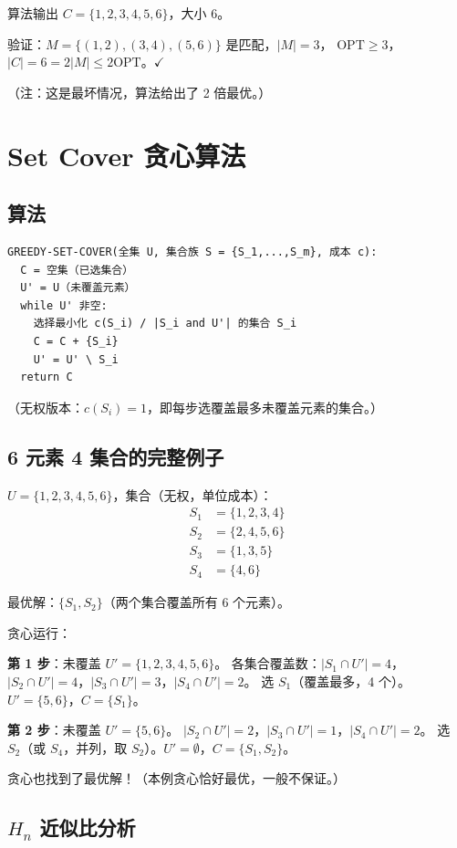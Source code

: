 \documentclass[UTF8,openany,12pt]{ctexbook}
\theoremstyle{remark}
\newcommand{\OPT}{\mathrm{OPT}}
\begin{document}
算法输出 $C = \{1,2,3,4,5,6\}$，大小 6。

验证：$M = \{(1,2),(3,4),(5,6)\}$ 是匹配，$|M|=3$，
$\OPT \ge 3$，$|C|=6=2|M| \le 2\OPT$。$\checkmark$

（注：这是最坏情况，算法给出了 2 倍最优。）

\section{Set Cover 贪心算法}

\subsection{算法}

\begin{lstlisting}[language={}]
GREEDY-SET-COVER(全集 U, 集合族 S = {S_1,...,S_m}, 成本 c):
  C = 空集（已选集合）
  U' = U（未覆盖元素）
  while U' 非空:
    选择最小化 c(S_i) / |S_i and U'| 的集合 S_i
    C = C + {S_i}
    U' = U' \ S_i
  return C
\end{lstlisting}

（无权版本：$c(S_i) = 1$，即每步选覆盖最多未覆盖元素的集合。）

\subsection{6 元素 4 集合的完整例子}

$U = \{1,2,3,4,5,6\}$，集合（无权，单位成本）：
\begin{align*}
  S_1 &= \{1,2,3,4\}\\
  S_2 &= \{2,4,5,6\}\\
  S_3 &= \{1,3,5\}\\
  S_4 &= \{4,6\}
\end{align*}

最优解：$\{S_1, S_2\}$（两个集合覆盖所有 6 个元素）。

贪心运行：

\textbf{第 1 步}：未覆盖 $U' = \{1,2,3,4,5,6\}$。
各集合覆盖数：$|S_1 \cap U'|=4$，$|S_2 \cap U'|=4$，$|S_3 \cap U'|=3$，$|S_4 \cap U'|=2$。
选 $S_1$（覆盖最多，4 个）。$U' = \{5,6\}$，$C = \{S_1\}$。

\textbf{第 2 步}：未覆盖 $U' = \{5,6\}$。
$|S_2 \cap U'|=2$，$|S_3 \cap U'|=1$，$|S_4 \cap U'|=2$。
选 $S_2$（或 $S_4$，并列，取 $S_2$）。$U' = \emptyset$，$C = \{S_1, S_2\}$。

贪心也找到了最优解！（本例贪心恰好最优，一般不保证。）

\subsection[Hn 近似比分析]{$H_n$ 近似比分析}
\end{document}
